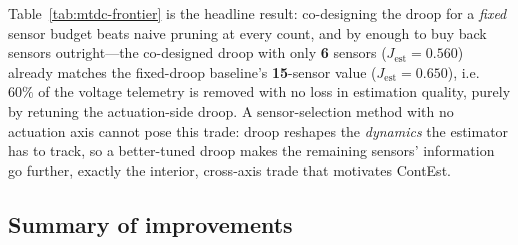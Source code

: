 \documentclass[twocolumn,amsthm]{autart}
\begin{document}
Table~\ref{tab:mtdc-frontier} is the headline result: co-designing the droop
for a \emph{fixed} sensor budget beats naive pruning at every count, and by
enough to buy back sensors outright---the co-designed droop with only \textbf{6}
sensors ($J_{\mathrm{est}}=0.560$) already matches the fixed-droop baseline's
\textbf{15}-sensor value ($J_{\mathrm{est}}=0.650$), i.e.\ $60\%$ of the
voltage telemetry is removed with no loss in estimation quality, purely by
retuning the actuation-side droop. A sensor-selection method with no actuation
axis \cite{joshi2009sensor,tzoumas2016sensor} cannot pose this trade: droop
reshapes the \emph{dynamics} the estimator has to track, so a better-tuned
droop makes the remaining sensors' information go further, exactly the
interior, cross-axis trade that motivates ContEst.

\subsection{Summary of improvements}
\label{sec:sim:summary}
\end{document}
